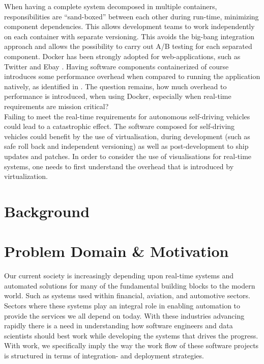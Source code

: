 When having a complete system decomposed in multiple containers, responsibilities are “sand-boxed” between each other during run-time, minimizing component dependencies. This allows development teams to work independently on each container with separate versioning. This avoids the big-bang integration approach and allows the possibility to carry out A/B testing for each separated component. Docker has been strongly adopted for web-applications, such as Twitter and Ebay \cite{7034713}. Having software components containerized of course introduces some performance overhead when compared to running the application natively, as identified in \cite{7034713}. The question remains, how much overhead to performance is introduced, when using Docker, especially when real-time requirements are mission critical?\\

Failing to meet the real-time requirements for autonomous self-driving vehicles could lead to a catastrophic effect. The software composed for self-driving vehicles could benefit by the use of virtualisation, during development (such as safe roll back and independent versioning) as well as post-development to ship updates and patches. In order to consider the use of visualisations for real-time systems, one needs to first understand the overhead that is introduced by virtualization.\\

\section{Background}

\section{Problem Domain \& Motivation}
Our current society is increasingly depending upon real-time systems and automated solutions for many of the fundamental building blocks to the modern world. Such as systems used within financial, aviation, and automotive sectors. Sectors where these systems play an integral role in enabling automation to provide the services we all depend on today. With these industries advancing rapidly there is a need in understanding how software engineers and data scientists should best work while developing the systems that drives the progress. With work, we specifically imply the way the work flow of these software projects is structured in terms of integration- and deployment strategies.\\

